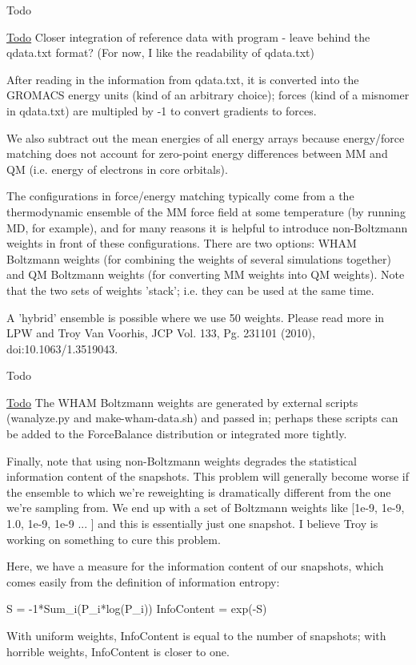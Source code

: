 \begin{DoxyRefDesc}{Todo}
\item[\hyperlink{todo__todo000003}{Todo}]Closer integration of reference data with program -\/ leave behind the qdata.\-txt format? (For now, I like the readability of qdata.\-txt)\end{DoxyRefDesc}
\begin{DoxyVerb}     After reading in the information from qdata.txt, it is converted
     into the GROMACS energy units (kind of an arbitrary choice);
     forces (kind of a misnomer in qdata.txt) are multipled by -1
     to convert gradients to forces.

     We also subtract out the mean energies of all energy arrays
     because energy/force matching does not account for zero-point
     energy differences between MM and QM (i.e. energy of electrons
     in core orbitals).

     The configurations in force/energy matching typically come
     from a the thermodynamic ensemble of the MM force field at
     some temperature (by running MD, for example), and for many
     reasons it is helpful to introduce non-Boltzmann weights in
     front of these configurations.  There are two options: WHAM
     Boltzmann weights (for combining the weights of several
     simulations together) and QM Boltzmann weights (for converting
     MM weights into QM weights).  Note that the two sets of weights
     'stack'; i.e. they can be used at the same time.

     A 'hybrid' ensemble is possible where we use 50%
     weights.  Please read more in LPW and Troy Van Voorhis, JCP
     Vol. 133, Pg. 231101 (2010), doi:10.1063/1.3519043.
\end{DoxyVerb}


\begin{DoxyRefDesc}{Todo}
\item[\hyperlink{todo__todo000004}{Todo}]The W\-H\-A\-M Boltzmann weights are generated by external scripts (wanalyze.\-py and make-\/wham-\/data.\-sh) and passed in; perhaps these scripts can be added to the Force\-Balance distribution or integrated more tightly.\end{DoxyRefDesc}
\begin{DoxyVerb}     Finally, note that using non-Boltzmann weights degrades the
     statistical information content of the snapshots.  This
     problem will generally become worse if the ensemble to which
     we're reweighting is dramatically different from the one we're
     sampling from.  We end up with a set of Boltzmann weights like
     [1e-9, 1e-9, 1.0, 1e-9, 1e-9 ... ] and this is essentially just
     one snapshot.  I believe Troy is working on something to cure
     this problem.

     Here, we have a measure for the information content of our snapshots,
     which comes easily from the definition of information entropy:

     S = -1*Sum_i(P_i*log(P_i))
     InfoContent = exp(-S)

     With uniform weights, InfoContent is equal to the number of snapshots;
     with horrible weights, InfoContent is closer to one.\end{DoxyVerb}
 

